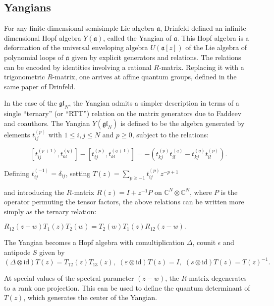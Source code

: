 \documentclass[12pt]{article}
\newcommand{\af}{\mathfrak{a}}
\begin{document}
\subsection{Yangians}
\label{sec:yangians}

For any finite-dimensional semisimple Lie algebra $\af$, Drinfeld defined an infinite-dimensional
Hopf algebra $Y(\af)$, called the Yangian of $\af$. This Hopf algebra is a deformation
of the universal enveloping algebra $U(\af[z])$ of the Lie algebra of polynomial loops
of $\af$ given by explicit generators and relations. The relations can be encoded by identities
involving a rational $R$-matrix. Replacing it with a trigonometric $R$-matrix, one
arrives at affine quantum groups, defined in the same paper of Drinfeld.

In the case of the $\mathfrak{gl}_{N}$, the Yangian admits a simpler description in terms of a single ``ternary'' (or ``RTT'') relation on the matrix generators due to Faddeev and coauthors. 
The Yangian $Y(\mathfrak{gl}_{N})$ is defined to be the algebra generated by elements $t_{ij}^{(p)}$ with $1 \leq i, j \leq N$ and $p \geq 0$, subject to the relations:

\begin{equation}
  \label{eq:1}
 [t_{ij}^{(p+1)}, t_{kl}^{(q)}] -  [t_{ij}^{(p)}, t_{kl}^{(q+1)}]= -(t_{kj}^{(p)}t_{il}^{(q)} - t_{kj}^{(q)} t_{il}^{(p)}).
\end{equation}


Defining $t_{ij}^{(-1)}=\delta_{ij}$, setting $ T(z) = \sum_{p\ge -1} t_{ij}^{(p)} z^{-p+1}$

and introducing the $R$-matrix $R(z) = I + z^{-1} P$ on $\mathbb{C}^{N}\otimes \mathbb{C}^{N}$,
where $P$ is the operator permuting the tensor factors, the above relations can be written more
simply as the ternary relation:

$\displaystyle{ R_{12}(z-w) T_{1}(z)T_{2}(w) = T_{2}(w) T_{1}(z) R_{12}(z-w).}$

The Yangian becomes a Hopf algebra with comultiplication $\Delta$, counit $\epsilon$ and antipode $S$ given by
\begin{equation}
  \label{eq:2}
  (\Delta \otimes \mathrm{id})T(z)=T_{12}(z)T_{13}(z), \,\, (\varepsilon\otimes \mathrm{id})T(z)= I, \,\, (s\otimes \mathrm{id})T(z)=T(z)^{-1}.
\end{equation}


At special values of the spectral parameter $(z-w) $, the $R$-matrix degenerates to a rank one
projection. This can be used to define the quantum determinant of $T(z) $, which generates the
center of the Yangian.
\end{document}
